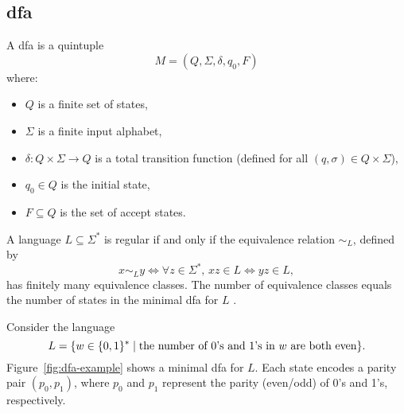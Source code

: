 \subsection{\acrfull{dfa}}
\label{subsec:dfa}

\begin{definition}
A \gls{dfa} is a quintuple 
\[
M = (Q, \Sigma, \delta, q_0, F)
\]
where:
\begin{itemize}
    \item \( Q \) is a finite set of states,
    \item \( \Sigma \) is a finite input alphabet,
    \item \( \delta: Q \times \Sigma \rightarrow Q \) is a total transition function (defined for all \( (q, \sigma) \in Q \times \Sigma \)),
    \item \( q_0 \in Q \) is the initial state,
    \item \( F \subseteq Q \) is the set of accept states.
\end{itemize}
\end{definition}

\begin{theorem}
    \label{thm:myhill-nerode}
    A language \( L \subseteq \Sigma^* \) is regular if and only if the equivalence relation \( \sim_L \), defined by
    \[
    x \sim_L y \iff \forall z \in \Sigma^*,\, xz \in L \Longleftrightarrow yz \in L,
    \]
    has finitely many equivalence classes. The number of equivalence classes equals the number of states in the minimal \gls{dfa} for \( L \) \cite{sipser2013introduction, myhill1957finite, nerode1958linear}.
\end{theorem}

\begin{example}
Consider the language 
\[
L = \{ w \in \{0,1\}^* \mid \text{the number of 0's and 1's in \( w \) are both even} \}.
\]
Figure~\ref{fig:dfa-example} shows a minimal \gls{dfa} for \( L \). Each state encodes a parity pair \((p_0, p_1)\), where \( p_0 \) and \( p_1 \) represent the parity (even/odd) of 0's and 1's, respectively.
\end{example}

